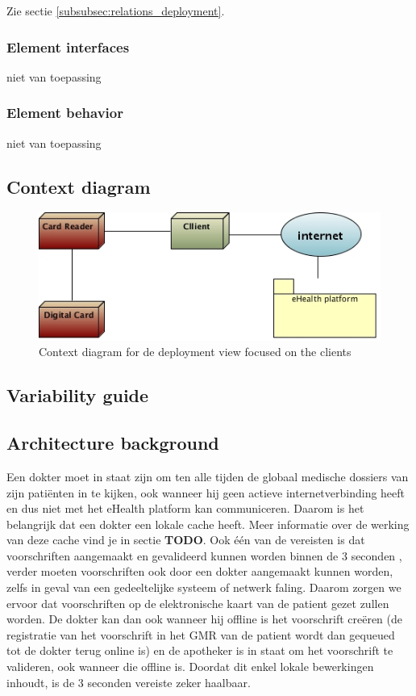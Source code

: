 \documentclass[a4paper,10pt]{article}
\begin{document}
Zie sectie \ref{subsubsec:relations_deployment}.

\subsubsection{Element interfaces}

niet van toepassing

\subsubsection{Element behavior}

niet van toepassing

\subsection{Context diagram}

\begin{center}
    \begin{figure}[!h]
      \includegraphics[width=\textwidth]{../images/deployment_clients_context.jpg}
	\caption{Context diagram for de deployment view focused on the clients}
    \end{figure}
  \end{center}

\subsection{Variability guide}

\subsection{Architecture background}
Een dokter moet in staat zijn om ten alle tijden de globaal medische dossiers van zijn patiënten in te kijken, ook wanneer hij geen actieve internetverbinding heeft en dus niet met het eHealth platform kan communiceren. Daarom is het belangrijk dat een dokter een lokale cache heeft. Meer informatie over de werking van deze cache vind je in sectie \textbf{TODO}.
Ook één van de vereisten is dat voorschriften aangemaakt en gevalideerd kunnen worden binnen de 3 seconden , verder moeten voorschriften ook door een dokter aangemaakt kunnen worden, zelfs in geval van een gedeeltelijke systeem of netwerk faling. Daarom zorgen we ervoor dat voorschriften op de elektronische kaart van de patient gezet zullen worden. De dokter kan dan ook wanneer hij offline is het voorschrift creëren (de registratie van het voorschrift in het GMR van de patient wordt dan gequeued tot de dokter terug online is) en de apotheker is in staat om het voorschrift te valideren, ook wanneer die offline is. Doordat dit enkel lokale bewerkingen inhoudt, is de 3 seconden vereiste zeker haalbaar.
\end{document}
